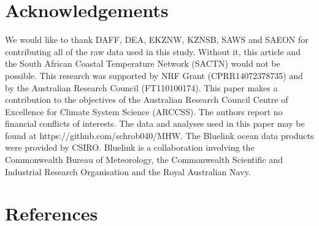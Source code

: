 \documentclass[a4paper,10pt,review]{elsarticle}
\begin{document}
\section*{Acknowledgements}
We would like to thank DAFF, DEA, EKZNW, KZNSB, SAWS and SAEON for contributing all of the raw data used in this study. Without it, this article and the South African Coastal Temperature Network (SACTN) would not be possible. This research was supported by NRF Grant (CPRR14072378735) and by the Australian Research Council (FT110100174). This paper makes a contribution to the objectives of the Australian Research Council Centre of Excellence for Climate System Science (ARCCSS). The authors report no financial conflicts of interests. The data and analyses used in this paper may be found at https://github.com/schrob040/MHW. The Bluelink ocean data products were provided by CSIRO. Bluelink is a collaboration involving the Commonwealth Bureau of Meteorology, the Commonwealth Scientific and Industrial Research Organisation and the Royal Australian Navy.

\section*{References}





\end{document}
